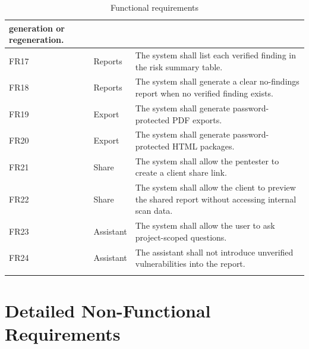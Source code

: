 \documentclass[12pt,a4paper]{report}
\begin{document}
\begin{longtable}{|p{}|p{}|p{}|}
generation or regeneration. \\
\hline
FR17 & Reports & The system shall list each verified finding in the risk summary table. \\
\hline
FR18 & Reports & The system shall generate a clear no-findings report when no verified
finding exists. \\
\hline
FR19 & Export & The system shall generate password-protected PDF exports. \\
\hline
FR20 & Export & The system shall generate password-protected HTML packages. \\
\hline
FR21 & Share & The system shall allow the pentester to create a client share link. \\
\hline
FR22 & Share & The system shall allow the client to preview the shared report without
accessing internal scan data. \\
\hline
FR23 & Assistant & The system shall allow the user to ask project-scoped questions. \\
\hline
FR24 & Assistant & The assistant shall not introduce unverified vulnerabilities into
the report. \\
\hline
\caption{Functional requirements}
\label{tab:functional_requirements}
\end{longtable}

\section{Detailed Non-Functional Requirements}
\end{document}
